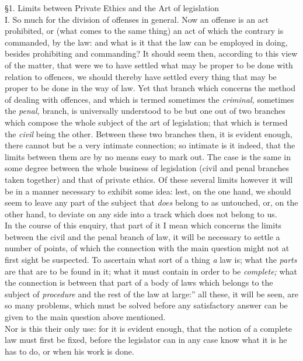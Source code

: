 \documentclass[12pt]{report}
\begin{document}
§1. Limits between Private Ethics and the Art of legislation\\
I. So much for the division of offenses in general. Now an offense is an
act prohibited, or (what comes to the same thing) an act of which the
contrary is commanded, by the law: and what is it that the law can be
employed in doing, besides prohibiting and commanding? It should seem
then, according to this view of the matter, that were we to have settled
what may be proper to be done with relation to offences, we should
thereby have settled every thing that may be proper to be done in the
way of law. Yet that branch which concerns the method of dealing with
offences, and which is termed sometimes the \emph{criminal,} sometimes
the \emph{penal,} branch, is universally understood to be but one out of
two branches which compose the whole subject of the art of legislation;
that which is termed the \emph{civil} being the other. Between these two
branches then, it is evident enough, there cannot but be a very intimate
connection; so intimate is it indeed, that the limits between them are
by no means easy to mark out. The case is the same in some degree
between the whole business of legislation (civil and penal branches
taken together) and that of private ethics. Of these several limits
however it will be in a manner necessary to exhibit some idea: lest, on
the one hand, we should seem to leave any part of the subject that
\emph{does} belong to as untouched, or, on the other hand, to deviate on
any side into a track which does not belong to us.\\
In the course of this enquiry, that part of it I mean which concerns the
limits between the civil and the penal branch of law, it will be
necessary to settle a number of points, of which the connection with the
main question might not at first sight be suspected. To ascertain what
sort of a thing \emph{a} law is; what the \emph{parts} are that are to
be found in it; what it must contain in order to be \emph{complete;}
what the connection is between that part of a body of laws which belongs
to the subject of \emph{procedure} and the rest of the law at
large:'' all these, it will be seen, are so many problems, which
must be solved before any satisfactory answer can be given to the main
question above mentioned.\\
Nor is this their only use: for it is evident enough, that the notion of
a complete law must first be fixed, before the legislator can in any
case know what it is he has to do, or when his work is done.
\end{document}
